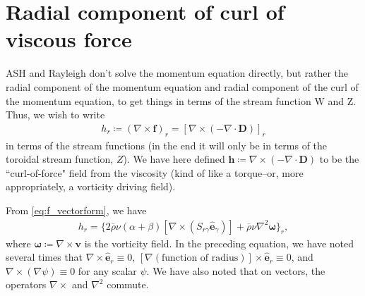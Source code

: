 \documentclass[12pt]{article} %
\newcommand{\e}{\hat{\bm{e}}}
\newcommand{\rhobar}{\overline{\rho}}
\newcommand{\curl}{\nabla\times}
\newcommand{\Div}{\nabla\cdot}
\begin{document}
	\section{Radial component of curl of viscous force}
	ASH and Rayleigh don't solve the momentum equation directly, but rather the radial component of the momentum equation and radial component of the curl of the momentum equation, to get things in terms of the stream function W and Z. Thus, we wish to write
	\begin{align}
	h_r \coloneqq (\nabla\times\bm{f})_r = [\nabla\times(-\Div\bm{D})]_r
	\end{align}
	in terms of the stream functions (in the end it will only be in terms of the toroidal stream function, $Z$). We have here defined $\bm{h}\coloneqq \nabla\times(-\Div\bm{D})$ to be the ``curl-of-force" field from the viscosity (kind of like a torque--or, more appropriately, a vorticity driving field).
	
	From \eqref{eq:f_vectorform}, we have 
	\begin{align*}
	h_r = \{2\rhobar\nu(\alpha+\beta)[\curl(S_{r\gamma}\e_\gamma)] + \rhobar\nu\nabla^2\bm{\omega}\}_r,
	\label{eq:hr_from_s_and_vort}
	\end{align*}
	where $\bm{\omega}\coloneqq\curl\bm{v}$ is the vorticity field. In the preceding equation, we have noted several times that $\nabla\times\e_r\equiv 0$, $[\nabla (\text{function of radius})]\times\e_r \equiv 0$, and $\nabla\times(\nabla \psi) \equiv 0$ for any scalar $\psi$. We have also noted that on vectors, the operators $\curl$ and $\nabla^2$ commute.
	
\end{document}
